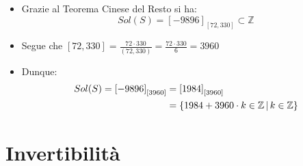 \documentclass[10pt]{article}
\begin{document}
\begin{itemize}
\begin{itemize}
\begin{enumerate}
	\begin{itemize}
	\item
	Grazie al Teorema Cinese del Resto si ha: $$Sol(S) = \left[-9896\right]_{\left[72,330\right]} \subset \mathbb{Z}$$ \smallskip
	\item
	Segue che $\displaystyle{\left[72,330\right] = \frac{72 \cdot 330}{(72,330)} = \frac{72 \cdot 330}{6} = 3960}$
	\item
	Dunque:
	\begin{equation}
	\begin{split}
	Sol(S) = \left[-9896\right]_{\left[3960\right]} &= \left[1984\right]_{\left[3960\right]} \\
	&= \{1984 + 3960 \cdot k \in \mathbb{Z} \,|\, k \in \mathbb{Z} \}
	\notag
	\end{split}
	\end{equation}
	\end{itemize}
	\end{enumerate}
	\end{itemize}
	\end{itemize}
	
	\newpage
  \section{Invertibilità}
\end{document}
